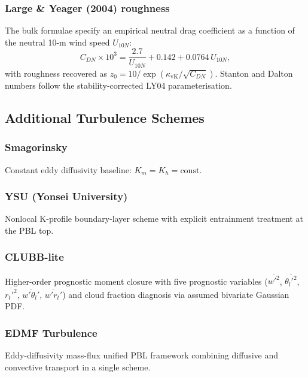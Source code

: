 \documentclass[11pt,a4paper]{article}
\begin{document}
\subsubsection{Large \& Yeager (2004) roughness}

The \citet{LargeYeager2004} bulk formulae specify an empirical neutral
drag coefficient as a function of the neutral 10-m wind speed $U_{10N}$:
\begin{equation}
  C_{DN}\times10^3 = \frac{2.7}{U_{10N}}+0.142+0.0764\,U_{10N},
\end{equation}
with roughness recovered as $z_0=10/\exp(\kappa_{\mathrm{vK}}/\sqrt{C_{DN}})$.  Stanton and Dalton numbers follow the stability-corrected LY04 parameterisation.

\subsection{Additional Turbulence Schemes}

\subsubsection{Smagorinsky}
Constant eddy diffusivity baseline: $K_m=K_h=\text{const}$.

\subsubsection{YSU (Yonsei University)}
Nonlocal K-profile boundary-layer scheme with explicit entrainment treatment at the PBL top.

\subsubsection{CLUBB-lite}
Higher-order prognostic moment closure with five prognostic variables ($\overline{w'^2}$, $\overline{\theta_l'^2}$, $\overline{r_t'^2}$, $\overline{w'\theta_l'}$, $\overline{w'r_t'}$) and cloud fraction diagnosis via assumed bivariate Gaussian PDF.

\subsubsection{EDMF Turbulence}
Eddy-diffusivity mass-flux unified PBL framework combining diffusive and convective transport in a single scheme.
\end{document}
